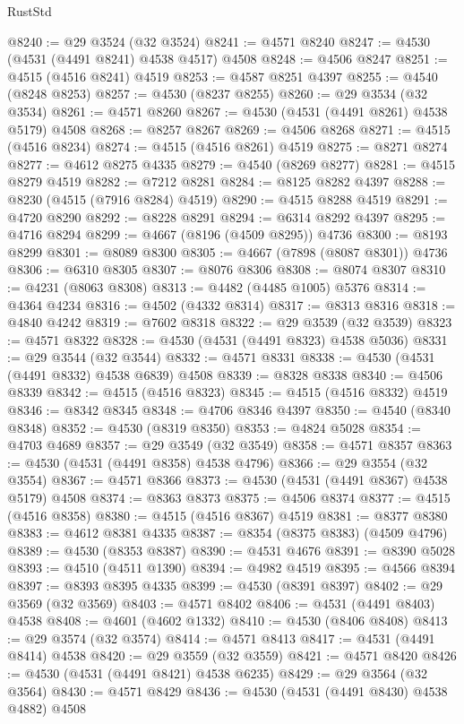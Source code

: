 \begin{lexlean}{RustStd}
\begin{coremodule}
@8240 := @29 @3524 (@32 @3524)
@8241 := @4571 @8240
@8247 := @4530 (@4531 (@4491 @8241) @4538 @4517) @4508
@8248 := @4506 @8247
@8251 := @4515 (@4516 @8241) @4519
@8253 := @4587 @8251 @4397
@8255 := @4540 (@8248 @8253)
@8257 := @4530 (@8237 @8255)
@8260 := @29 @3534 (@32 @3534)
@8261 := @4571 @8260
@8267 := @4530 (@4531 (@4491 @8261) @4538 @5179) @4508
@8268 := @8257 @8267
@8269 := @4506 @8268
@8271 := @4515 (@4516 @8234)
@8274 := @4515 (@4516 @8261) @4519
@8275 := @8271 @8274
@8277 := @4612 @8275 @4335
@8279 := @4540 (@8269 @8277)
@8281 := @4515 @8279 @4519
@8282 := @7212 @8281
@8284 := @8125 @8282 @4397
@8288 := @8230 (@4515 (@7916 @8284) @4519)
@8290 := @4515 @8288 @4519
@8291 := @4720 @8290
@8292 := @8228 @8291
@8294 := @6314 @8292 @4397
@8295 := @4716 @8294
@8299 := @4667 (@8196 (@4509 @8295)) @4736
@8300 := @8193 @8299
@8301 := @8089 @8300
@8305 := @4667 (@7898 (@8087 @8301)) @4736
@8306 := @6310 @8305
@8307 := @8076 @8306
@8308 := @8074 @8307
@8310 := @4231 (@8063 @8308)
@8313 := @4482 (@4485 @1005) @5376
@8314 := @4364 @4234
@8316 := @4502 (@4332 @8314)
@8317 := @8313 @8316
@8318 := @4840 @4242
@8319 := @7602 @8318
@8322 := @29 @3539 (@32 @3539)
@8323 := @4571 @8322
@8328 := @4530 (@4531 (@4491 @8323) @4538 @5036)
@8331 := @29 @3544 (@32 @3544)
@8332 := @4571 @8331
@8338 := @4530 (@4531 (@4491 @8332) @4538 @6839) @4508
@8339 := @8328 @8338
@8340 := @4506 @8339
@8342 := @4515 (@4516 @8323)
@8345 := @4515 (@4516 @8332) @4519
@8346 := @8342 @8345
@8348 := @4706 @8346 @4397
@8350 := @4540 (@8340 @8348)
@8352 := @4530 (@8319 @8350)
@8353 := @4824 @5028
@8354 := @4703 @4689
@8357 := @29 @3549 (@32 @3549)
@8358 := @4571 @8357
@8363 := @4530 (@4531 (@4491 @8358) @4538 @4796)
@8366 := @29 @3554 (@32 @3554)
@8367 := @4571 @8366
@8373 := @4530 (@4531 (@4491 @8367) @4538 @5179) @4508
@8374 := @8363 @8373
@8375 := @4506 @8374
@8377 := @4515 (@4516 @8358)
@8380 := @4515 (@4516 @8367) @4519
@8381 := @8377 @8380
@8383 := @4612 @8381 @4335
@8387 := @8354 (@8375 @8383) (@4509 @4796)
@8389 := @4530 (@8353 @8387)
@8390 := @4531 @4676
@8391 := @8390 @5028
@8393 := @4510 (@4511 @1390)
@8394 := @4982 @4519
@8395 := @4566 @8394
@8397 := @8393 @8395 @4335
@8399 := @4530 (@8391 @8397)
@8402 := @29 @3569 (@32 @3569)
@8403 := @4571 @8402
@8406 := @4531 (@4491 @8403) @4538
@8408 := @4601 (@4602 @1332)
@8410 := @4530 (@8406 @8408)
@8413 := @29 @3574 (@32 @3574)
@8414 := @4571 @8413
@8417 := @4531 (@4491 @8414) @4538
@8420 := @29 @3559 (@32 @3559)
@8421 := @4571 @8420
@8426 := @4530 (@4531 (@4491 @8421) @4538 @6235)
@8429 := @29 @3564 (@32 @3564)
@8430 := @4571 @8429
@8436 := @4530 (@4531 (@4491 @8430) @4538 @4882) @4508

\end{coremodule}
\end{lexlean}
